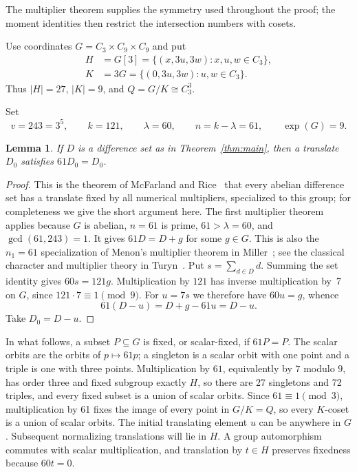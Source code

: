 \documentclass[11pt]{article}
\newtheorem{lemma}{Lemma}
\begin{document}
The multiplier theorem supplies the symmetry used throughout the proof;
the moment identities then restrict the intersection numbers with cosets.

Use coordinates $G=C_3\times C_9\times C_9$ and put
\[
\begin{split}
 H&=G[3]=\{(x,3u,3w):x,u,w\in C_3\},\\
 K&=3G=\{(0,3u,3w):u,w\in C_3\}.
\end{split}
\]
Thus $|H|=27$, $|K|=9$, and
$Q=G/K\cong C_3^3$.

Set
\[
 v=243=3^5,\qquad k=121,\qquad\lambda=60,\qquad
 n=k-\lambda=61,\qquad\exp(G)=9.
\]

\begin{lemma}\label{lem:fixed}
If $D$ is a difference set as in Theorem~\ref{thm:main}, then a
translate $D_0$ satisfies $61D_0=D_0$.
\end{lemma}
\begin{proof}
This is the theorem of McFarland and Rice~\cite{McFarlandRice1978} that
every abelian difference set has a translate fixed by all numerical
multipliers, specialized to this group; for completeness we give the
short argument here.
The first multiplier theorem applies because $G$ is abelian,
$n=61$ is prime, $61>\lambda=60$, and $\gcd(61,243)=1$.
It gives $61D=D+g$ for some $g\in G$. This is also the
$n_1=61$ specialization of Menon's multiplier theorem in
Miller~\cite[Theorem~5]{Miller2025}; see the classical character
and multiplier theory in Turyn~\cite{Turyn1965}.
Put $s=\sum_{d\in D}d$. Summing the set identity gives
$60s=121g$. Multiplication by $121$ has inverse multiplication
by~7 on $G$, since $121\cdot7\equiv1\pmod9$.
For $u=7s$ we therefore have $60u=g$, whence
\[
 61(D-u)=D+g-61u=D-u.
\]
Take $D_0=D-u$.
\end{proof}

In what follows, a subset $P\subseteq G$ is fixed, or scalar-fixed, if
$61P=P$. The scalar orbits are the orbits of $p\mapsto61p$; a singleton
is a scalar orbit with one point and a triple is one with three points.
Multiplication by $61$, equivalently by $7$ modulo $9$, has order
three and fixed subgroup exactly $H$, so there are 27 singletons and 72
triples, and every fixed subset is a union of scalar orbits. Since
$61\equiv1\pmod3$, multiplication by 61 fixes the image of every point
in $G/K=Q$, so every $K$-coset is a union of scalar orbits.
The initial translating element $u$ can be anywhere in $G$.
Subsequent normalizing translations will lie in $H$.
A group automorphism commutes with scalar
multiplication, and translation by $t\in H$ preserves fixedness
because $60t=0$.
\end{document}

